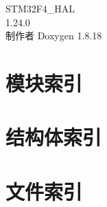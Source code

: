 \let\mypdfximage\pdfximage\def\pdfximage{\immediate\mypdfximage}\documentclass[twoside]{book}
\newcommand{\+}{\discretionary{\mbox{\scriptsize$\hookleftarrow$}}{}{}}
\newcommand{\clearemptydoublepage}{%
  \newpage{\pagestyle{empty}\cleardoublepage}%
}
\begin{document}
\begin{CJK}{UTF8}{min}

\hypersetup{pageanchor=false,
             bookmarksnumbered=true,
             pdfencoding=unicode
            }
\begin{titlepage}
\vspace*{7cm}
\begin{center}%
{\Large S\+T\+M32\+F4\+\_\+\+H\+AL \\[1ex]\large 1.\+24.\+0 }\\
\vspace*{1cm}
{\large 制作者 Doxygen 1.8.18}\\
\end{center}
\end{titlepage}
\clearemptydoublepage
{}
\tableofcontents
\clearemptydoublepage
{}
\hypersetup{pageanchor=true}

\chapter{模块索引}

\chapter{结构体索引}

\chapter{文件索引}


\end{CJK}
\end{document}
